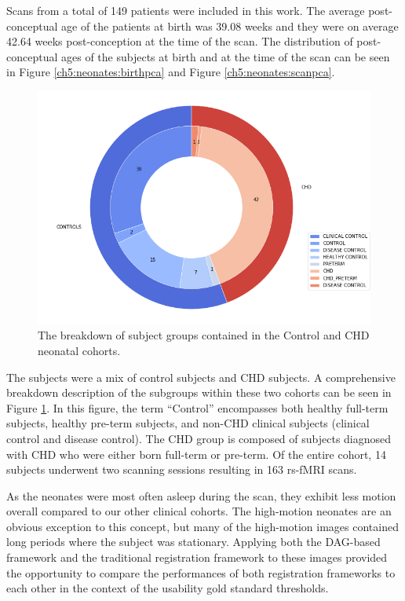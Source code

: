 Scans from a total of 149 patients were included in this work. The average post-conceptual age of the patients at birth was 39.08 weeks and they were on average 42.64 weeks post-conception at the time of the scan. The distribution of post-conceptual ages of the subjects at birth and at the time of the scan can be seen in Figure \ref{ch5:neonates:birthpca} and Figure \ref{ch5:neonates:scanpca}. 

\begin{figure}
\centering
\includegraphics[width=.75\textwidth]{5/demo_neonate_subj_cohort.png}
\caption{The breakdown of subject groups contained in the Control and CHD neonatal cohorts.}
\label{ch5:neonates:cohorts}
\end{figure}

The subjects were a mix of control subjects and CHD subjects. A comprehensive breakdown description of the subgroups within these two cohorts can be seen in Figure \ref{ch5:neonates:cohorts}. In this figure, the term ``Control'' encompasses both healthy full-term subjects, healthy pre-term subjects, and non-CHD clinical subjects (clinical control and disease control). The CHD group is composed of subjects diagnosed with CHD who were either born full-term or pre-term. Of the entire cohort, 14 subjects underwent two scanning sessions resulting in 163 rs-fMRI scans.

As the neonates were most often asleep during the scan, they exhibit less motion overall compared to our other clinical cohorts. The high-motion neonates are an obvious exception to this concept, but many of the high-motion images contained long periods where the subject was stationary. Applying both the DAG-based framework and the traditional registration framework to these images provided the opportunity to compare the performances of both registration frameworks to each other in the context of the usability gold standard thresholds. 


